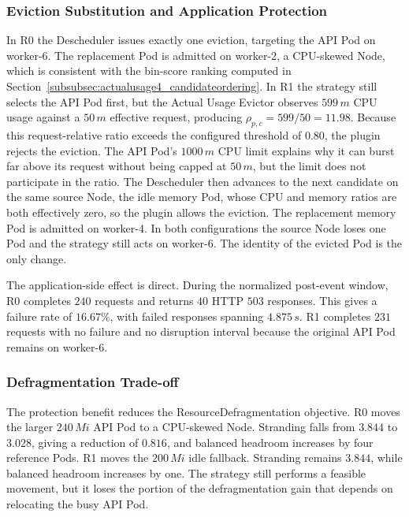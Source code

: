 \subsubsection{Eviction Substitution and Application Protection}
\label{subsubsec:actualusage4_substitution}

In R0 the Descheduler issues exactly one eviction, targeting the API Pod on worker-6. The replacement Pod is admitted on worker-2, a CPU-skewed Node, which is consistent with the bin-score ranking computed in Section~\ref{subsubsec:actualusage4_candidateordering}. In R1 the strategy still selects the API Pod first, but the Actual Usage Evictor observes \(599\,m\) CPU usage against a \(50\,m\) effective request, producing \(\rho_{p,c}=599/50=11.98\). Because this request-relative ratio exceeds the configured threshold of \(0.80\), the plugin rejects the eviction. The API Pod's \(1000\,m\) CPU limit explains why it can burst far above its request without being capped at \(50\,m\), but the limit does not participate in the ratio. The Descheduler then advances to the next candidate on the same source Node, the idle memory Pod, whose CPU and memory ratios are both effectively zero, so the plugin allows the eviction. The replacement memory Pod is admitted on worker-4. In both configurations the source Node loses one Pod and the strategy still acts on worker-6. The identity of the evicted Pod is the only change.

The application-side effect is direct. During the normalized post-event window, R0 completes \(240\) requests and returns \(40\) HTTP \(503\) responses. This gives a failure rate of \(16.67\%\), with failed responses spanning \(4.875\,s\). R1 completes \(231\) requests with no failure and no disruption interval because the original API Pod remains on worker-6.

\subsubsection{Defragmentation Trade-off}
\label{subsubsec:actualusage4_strandingtradeoff}

The protection benefit reduces the ResourceDefragmentation objective. R0 moves the larger \(240\,Mi\) API Pod to a CPU-skewed Node. Stranding falls from \(3.844\) to \(3.028\), giving a reduction of \(0.816\), and balanced headroom increases by four reference Pods. R1 moves the \(200\,Mi\) idle fallback. Stranding remains \(3.844\), while balanced headroom increases by one. The strategy still performs a feasible movement, but it loses the portion of the defragmentation gain that depends on relocating the busy API Pod.

